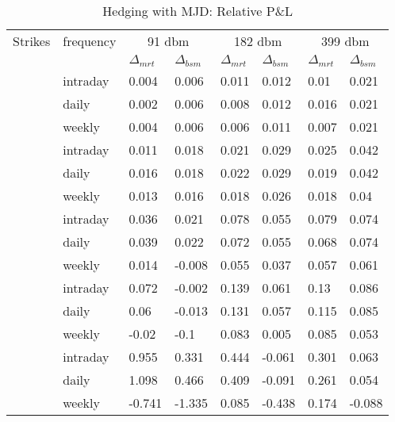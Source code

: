 \documentclass[12pt]{report}
\begin{document}
\begin{table}[ht]
\centering
\begin{tabular}{llllllll}
  \hline
  \hline
 Strikes & frequency  &\multicolumn{2}{c}{91 dbm} & \multicolumn{2}{c}{182 dbm} & \multicolumn{2}{c}{399 dbm} \\ 
   &  & $\Delta_{mrt}$ & $\Delta_{bsm}$ & $\Delta_{mrt}$ & $\Delta_{bsm}$ & $\Delta_{mrt}$ & $\Delta_{bsm}$ \\ 
   \hdashline
  \multirow{3}{*}{140} & intraday & 0.004 & 0.006 & 0.011 & 0.012 & 0.01 & 0.021 \\ 
  & daily & 0.002 & 0.006 & 0.008 & 0.012 & 0.016 & 0.021 \\ 
  & weekly & 0.004 & 0.006 & 0.006 & 0.011 & 0.007 & 0.021 \\ 
   \hdashline
  \multirow{3}{*}{160} & intraday & 0.011 & 0.018 & 0.021 & 0.029 & 0.025 & 0.042 \\ 
  & daily & 0.016 & 0.018 & 0.022 & 0.029 & 0.019 & 0.042 \\ 
  & weekly & 0.013 & 0.016 & 0.018 & 0.026 & 0.018 & 0.04 \\ 
   \hdashline
  \multirow{3}{*}{186} & intraday & 0.036 & 0.021 & 0.078 & 0.055 & 0.079 & 0.074 \\ 
  & daily & 0.039 & 0.022 & 0.072 & 0.055 & 0.068 & 0.074 \\ 
  & weekly & 0.014 & -0.008 & 0.055 & 0.037 & 0.057 & 0.061 \\ 
   \hdashline
  \multirow{3}{*}{200} & intraday & 0.072 & -0.002 & 0.139 & 0.061 & 0.13 & 0.086 \\ 
  & daily & 0.06 & -0.013 & 0.131 & 0.057 & 0.115 & 0.085 \\ 
  & weekly & -0.02 & -0.1 & 0.083 & 0.005 & 0.085 & 0.053 \\ 
   \hdashline
  \multirow{3}{*}{230} & intraday & 0.955 & 0.331 & 0.444 & -0.061 & 0.301 & 0.063 \\ 
  & daily & 1.098 & 0.466 & 0.409 & -0.091 & 0.261 & 0.054 \\ 
  & weekly & -0.741 & -1.335 & 0.085 & -0.438 & 0.174 & -0.088 \\ 
   \hline
\end{tabular}
\caption{Hedging with MJD: Relative P\&L} 
\label{t:analysis:merton:pl}
\end{table}
\end{document}
